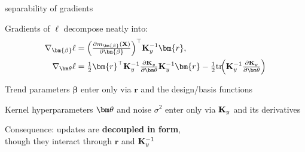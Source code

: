 \documentclass[11pt,compress,t,notes=noshow, xcolor=table]{beamer}
\begin{document}
\begin{framei}[sep=L]{separability of gradients}
\item Gradients of $\ell$ decompose neatly into:
\begin{align*}
\nabla_{\bm{\beta}} \ell &= 
\Big(\tfrac{\partial m_{\bm{\beta}}(\Xmat)}{\partial \bm{\beta}}\Big)^\top \Ky^{-1}\bm{r}, \\
\nabla_{\thetav} \ell &= 
\tfrac{1}{2}\bm{r}^\top \Ky^{-1}\tfrac{\partial \Ky}{\partial\thetav}\Ky^{-1}\bm{r}
- \tfrac{1}{2}\mathrm{tr}\!\Big(\Ky^{-1}\tfrac{\partial \Ky}{\partial \thetav}\Big)
\end{align*}
\item Trend parameters $\bm{\beta}$ enter only via $\bm{r}$ and the design/basis functions
\item Kernel hyperparameters $\thetav$ and noise $\sigma^2$ enter only via $\mathbf{K}_y$ and its derivatives
\item Consequence: updates are \textbf{decoupled in form}, \\though they interact through $\bm{r}$ and $\mathbf{K}_y^{-1}$
\end{framei}



\endlecture
\end{document}
